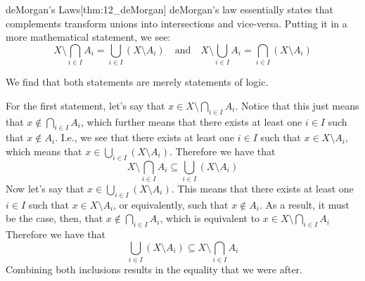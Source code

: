 \begin{thmBox}{deMorgan's Laws}[thm:12_deMorgan]
    deMorgan's law essentially states that complements transform unions into 
    intersections and vice-versa. Putting it in a more mathematical statement, 
    we see: 
    \begin{equation*}
        X \setminus \bigcap_{ i \in I } A_{ i }
        =
        \bigcup_{ i \in I } ( X \setminus A_{ i } )
        \quad \mathrm{and} \quad
        X \setminus \bigcup_{ i \in I } A_{ i }
        =
        \bigcap_{ i \in I } ( X \setminus A_{ i } )
    \end{equation*}

    \baseRule

    \begin{proofBox}
        We find that both statements are merely statements of logic. 

        \baseSkip 

        For the first statement, let's say that 
        \( x \in X \setminus \bigcap_{ i \in I } A_{ i } \).
        Notice that this just means that 
        \( x \notin \bigcap_{ i \in I } A_{ i } \), which further means 
        that there exists at least one \( i \in I \) such that 
        \( x \notin A_{ i } \). 
        I.e., we see that there exists at least one \( i \in I \) such that 
        \( x \in X \setminus A_{ i } \), which means that 
        \( x \in \bigcup_{ i \in I } ( X \setminus A_{ i } ) \).
        Therefore we have that 
        \begin{equation*}
            X \setminus \bigcap_{ i \in I } A_{ i }
            \subseteq
            \bigcup_{ i \in I } ( X \setminus A_{ i } )
        \end{equation*}
        Now let's say that 
        \( x \in \bigcup_{ i \in I } ( X \setminus A_{ i } ) \). 
        This means that there exists at least one \( i \in I \) such that 
        \( x \in X \setminus A_{ i } \), or equivalently, such that 
        \( x \notin A_{ i } \). 
        As a result, it must be the case, then, that 
        \( x \notin \bigcap_{ i \in I } A_{ i } \), which is equivalent to 
        \( x \in X \setminus \bigcap_{ i \in I } A_{ i } \)
        Therefore we have that 
        \begin{equation*}
            \bigcup_{ i \in I } ( X \setminus A_{ i } )
            \subseteq
            X \setminus \bigcap_{ i \in I } A_{ i }
        \end{equation*}
        Combining both inclusions results in the equality that we were after.


\end{proofBox}
\end{thmBox}

